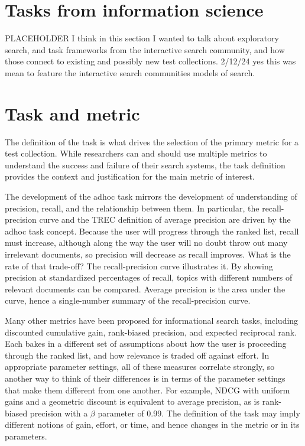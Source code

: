 \documentclass[nobib]{tufte-book}
\begin{document}
\section{Tasks from information science}

PLACEHOLDER I think in this section I wanted to talk about exploratory search, and task frameworks from the interactive search community, and how those connect to existing and possibly new test collections.  2/12/24 yes this was mean to feature the interactive search communities models of search.

\section{Task and metric}

The definition of the task is what drives the selection of the primary metric for a test collection.  While researchers can and should use multiple metrics to understand the success and failure of their search systems, the task definition provides the context and justification for the main metric of interest.

The development of the adhoc task mirrors the development of understanding of precision, recall, and the relationship between them.  In particular, the recall-precision curve and the TREC definition of average precision are driven by the adhoc task concept.  Because the user will progress through the ranked list, recall must increase, although along the way the user will no doubt throw out many irrelevant documents, so precision will decrease as recall improves.  What is the rate of that trade-off?  The recall-precision curve illustrates it.  By showing precision at standardized percentages of recall, topics with different numbers of relevant documents can be compared.  Average precision is the area under the curve, hence a single-number summary of the recall-precision curve.

Many other metrics have been proposed for informational search tasks, including discounted cumulative gain, rank-biased precision, and expected reciprocal rank.  Each bakes in a different set of assumptions about how the user is proceeding through the ranked list, and how relevance is traded off against effort.  In appropriate parameter settings, all of these measures correlate strongly, so another way to think of their differences is in terms of the parameter settings that make them different from one another.  For example, NDCG with uniform gains and a geometric discount is equivalent to average precision, as is rank-biased precision with a $\beta$ parameter of 0.99.  The definition of the task may imply different notions of gain, effort, or time, and hence changes in the metric or in its parameters.
\end{document}
